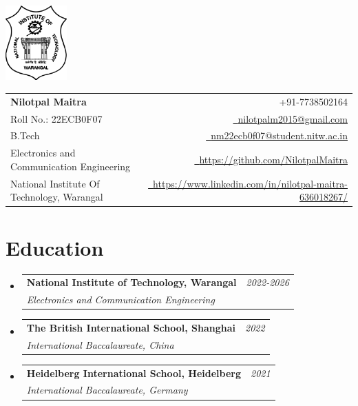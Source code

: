 \documentclass[a4paper,11pt]{article}
\makeatletter
\newcommand{\resumeSubheading}[4]{
\vspace{0.5mm}\item
    \begin{tabular*}{0.98\textwidth}[t]{l@{\extracolsep{\fill}}r}
        \textbf{#1} & \textit{\footnotesize{#4}} \\
        \textit{\footnotesize{#3}} &  \footnotesize{#2}\\
    \end{tabular*}
    \vspace{-2.4mm}
}
\newcommand{\resumeSubHeadingListStart}{\begin{itemize}[leftmargin=*,labelsep=0mm]}
\newcommand{\resumeSubHeadingListEnd}{\end{itemize}\vspace{2mm}}
\newcommand{\name}{Nilotpal Maitra} %
\newcommand{\course}{B.Tech} %
\newcommand{\roll}{22ECB0F07} %
\newcommand{\phone}{7738502164} %
\newcommand{\emaila}{nilotpalm2015@gmail.com} %
\newcommand{\emailb}{nm22ecb0f07@student.nitw.ac.in} %
\makeatother
\begin{document}
\selectfont


\parbox{2.35cm}{%
\includegraphics[width=2.35cm,clip]{Mnit_logo_bw.png}
}
\parbox{\dimexpr\linewidth-2.8cm\relax}{
\begin{tabularx}{\linewidth}{L r} \\
  \textbf{\Large \name} & {\raisebox{0.0\height}{\footnotesize \faPhone}\ +91-\phone}\\
  {Roll No.: \roll} & \href{mailto:\emaila}{\raisebox{0.0\height}{\footnotesize \faEnvelope}\ {\emaila}} \\
  \course &  \href{mailto:\emailb}{\raisebox{0.0\height}{\footnotesize \faEnvelope}\ {\emailb}}\\
  {Electronics and Communication Engineering} &  \href{https://yourGithubProfile.com/}{\raisebox{0.0\height}{\footnotesize \faGithub}\ {https://github.com/NilotpalMaitra}} \\
  {National Institute Of Technology, Warangal} & \href{https://www.yourLinkedinProfile.com/in/}{\raisebox{0.0\height}{\footnotesize \faLinkedin}\ {https://www.linkedin.com/in/nilotpal-maitra-636018267/}}
\end{tabularx}
}




\section{\textbf{Education}}
  \resumeSubHeadingListStart
    \resumeSubheading
      {National Institute of Technology, Warangal}{}
      {Electronics and Communication Engineering}{2022-2026}
    \resumeSubheading
      {The British International School, Shanghai}{}
      {International Baccalaureate, China}{2022}
    \resumeSubheading
        {Heidelberg International School, Heidelberg}{}
        {International Baccalaureate, Germany}{2021}
  \resumeSubHeadingListEnd
\vspace{-5.5mm}
%



\end{document}
